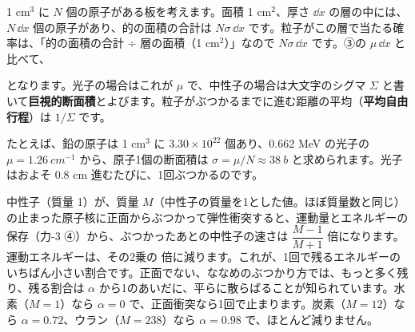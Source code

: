 \noindent\begin{minipage}[c]{0.56\linewidth}\raggedright
1 cm$^3$ に $N$ 個の原子がある板を考えます。面積 1 cm$^2$、厚さ $\dd x$ の層の中には、$N\,\dd x$ 個の原子があり、的の面積の合計は $N\sigma\,\dd x$ です。粒子がこの層で当たる確率は、「的の面積の合計 ÷ 層の面積（1 cm$^2$）」なので $N\sigma\,\dd x$ です。③の $\mu\,\dd x$ と比べて、
\end{minipage}\hfill
\begin{minipage}[c]{0.40\linewidth}\centering
{}
\end{minipage}
\label{ph:原-13:sigma}となります。光子の場合はこれが $\mu$ で、中性子の場合は大文字のシグマ $\Sigma$ と書いて\textbf{巨視的断面積}とよびます。粒子がぶつかるまでに進む距離の平均（\textbf{平均自由行程}）は $1/\Sigma$ です。

たとえば、鉛の原子は 1 cm$^3$ に $3.30\times10^{22}$ 個あり、0.662 MeV の光子の $\mu=\qty{1.26}{cm^{-1}}$ から、原子1個の断面積は $\sigma=\mu/N\approx\qty{38}{b}$ と求められます。光子はおよそ 0.8 cm 進むたびに、1回ぶつかるのです。

中性子（質量 1）が、質量 $M$（中性子の質量を1とした値。ほぼ質量数と同じ）の止まった原子核に正面からぶつかって弾性衝突すると、運動量とエネルギーの保存（力-3 ④）から、ぶつかったあとの中性子の速さは $\dfrac{M-1}{M+1}$ 倍になります。運動エネルギーは、その2乗の
倍に減ります。これが、1回で残るエネルギーのいちばん小さい割合です。正面でない、ななめのぶつかり方では、もっと多く残り、残る割合は $\alpha$ から1のあいだに、平らに散らばることが知られています。水素（$M=1$）なら $\alpha=0$ で、正面衝突なら1回で止まります。炭素（$M=12$）なら $\alpha=0.72$、ウラン（$M=238$）なら $\alpha=0.98$ で、ほとんど減りません。

